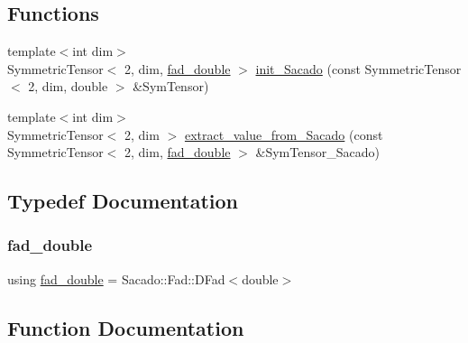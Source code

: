 \subsection*{Functions}
\begin{DoxyCompactItemize}
\item 
{\footnotesize template$<$int dim$>$ }\\Symmetric\+Tensor$<$ 2, dim, \hyperlink{Sacado-auxiliary__functions_8h_a868b94676739e612d9c95940e70892a9}{fad\+\_\+double} $>$ \hyperlink{Sacado-auxiliary__functions_8h_a05eaab6eac85b896a69c4fc2984628bc}{init\+\_\+\+Sacado} (const Symmetric\+Tensor$<$ 2, dim, double $>$ \&Sym\+Tensor)
\item 
{\footnotesize template$<$int dim$>$ }\\Symmetric\+Tensor$<$ 2, dim $>$ \hyperlink{Sacado-auxiliary__functions_8h_aad3b558b1d45add85343228c2a2146f6}{extract\+\_\+value\+\_\+from\+\_\+\+Sacado} (const Symmetric\+Tensor$<$ 2, dim, \hyperlink{Sacado-auxiliary__functions_8h_a868b94676739e612d9c95940e70892a9}{fad\+\_\+double} $>$ \&Sym\+Tensor\+\_\+\+Sacado)
\end{DoxyCompactItemize}


\subsection{Typedef Documentation}
\mbox{\label{Sacado-auxiliary__functions_8h_a868b94676739e612d9c95940e70892a9}} 
\subsubsection{\texorpdfstring{fad\+\_\+double}{fad\_double}}
{\footnotesize\ttfamily using \hyperlink{Sacado-auxiliary__functions_8h_a868b94676739e612d9c95940e70892a9}{fad\+\_\+double} =  Sacado\+::\+Fad\+::\+D\+Fad$<$double$>$}



\subsection{Function Documentation}
\mbox{\label{Sacado-auxiliary__functions_8h_aad3b558b1d45add85343228c2a2146f6}} 
